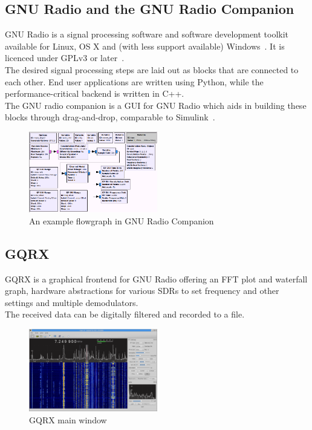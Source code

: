 \documentclass[conference]{IEEEtran}
\begin{document}
\subsection{GNU Radio and the GNU Radio Companion}
GNU Radio is a signal processing software and software development toolkit available for Linux, OS X and (with less support available) Windows~\cite{Gnu19FAQ}\cite{Gnu19What}. It is licenced under GPLv3 or later~\cite{Gnu19FAQ}.\\
The desired signal processing steps are laid out as blocks that are connected to each other. End user applications are written using Python, while the performance-critical backend is written in C++.\\
The GNU radio companion is a GUI for GNU Radio which aids in building these blocks through drag-and-drop, comparable to Simulink~\cite{Gnu19FAQ}.\\
\begin{figure}[H]
	\centering
	\includegraphics[width=0.5\textwidth]{gnuradio_example_flowgraph}
	\caption{An example flowgraph in GNU Radio Companion~\cite{Gnu19Example}}
\end{figure}

\subsection{GQRX}
GQRX is a graphical frontend for GNU Radio offering an FFT plot and waterfall graph, hardware abstractions for various SDRs to set frequency and other settings and multiple demodulators.\\
The received data can be digitally filtered and recorded to a file.~\cite{GQRX19Home}
\begin{figure}[H]
	\centering
	\includegraphics[width=0.5\textwidth]{gqrx_main_window}
	\caption{GQRX main window~\cite{GQRX19Home}}
\end{figure}
\end{document}
